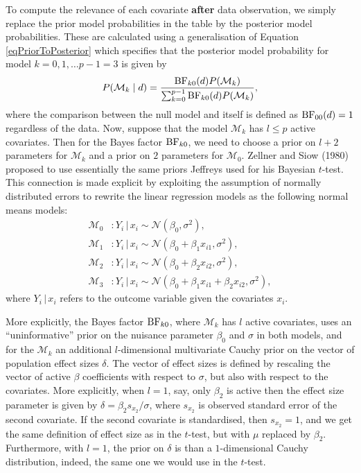 \documentclass[english,,doc,floatsintext]{apa6}
\begin{document}
To compute the relevance of each covariate \textbf{after} data observation, we simply replace the prior model probabilities in the table by the posterior model probabilities. These are calculated using a generalisation of Equation \eqref{eqPriorToPosterior} which specifies that the posterior model probability for model \(k=0, 1, \ldots p-1 = 3\) is given by
\begin{equation}
\label{eqPriorToPosteriorGeneral}
P(\mathcal{M}_{k} \mid d) = \frac{ \textnormal{BF}_{k0}(d) P(\mathcal{M}_{k})}{ \sum_{k=0}^{p-1} \textnormal{BF}_{k0}(d) P(\mathcal{M}_{k})},
\end{equation}
where the comparison between the null model and itself is defined as \(\textnormal{BF}_{00}(d) = 1\) regardless of the data. Now, suppose that the model \(\mathcal{M}_{k}\) has \(l \leq p\) active covariates. Then for the Bayes factor \(\textnormal{BF}_{k0}\), we need to choose a prior on \(l + 2\) parameters for \(\mathcal{M}_{k}\) and a prior on \(2\) parameters for \(\mathcal{M}_{0}\). Zellner and Siow (1980) proposed to use essentially the same priors Jeffreys used for his Bayesian \(t\)-test. This connection is made explicit by exploiting the assumption of normally distributed errors to rewrite the linear regression models as the following normal means models:
\begin{align}
\label{eqLinRegAsNormal0}
\mathcal{M}_{0} & : Y_{i} \, | \, x_{i} \sim \mathcal{N}(\beta_{0}, \sigma^{2}), \\
\mathcal{M}_{1} & : Y_{i} \, | \, x_{i} \sim \mathcal{N}(\beta_{0} + \beta_{1} x_{i1}, \sigma^{2}), \\
\mathcal{M}_{2} & : Y_{i} \, | \, x_{i} \sim \mathcal{N}(\beta_{0} + \beta_{2} x_{i2}, \sigma^{2}), \\
\label{eqLinRegAsNormal3}
\mathcal{M}_{3} & : Y_{i} \, | \, x_{i} \sim \mathcal{N}(\beta_{0} + \beta_{1} x_{i1} + \beta_{2} x_{i2} , \sigma^{2}),
\end{align}
where \(Y_{i} \, | \, x_{i}\) refers to the outcome variable given the covariates \(x_{i}\).

More explicitly, the Bayes factor \(\textnormal{BF}_{k0}\), where \(\mathcal{M}_{k}\) has \(l\) active covariates, uses an \enquote{uninformative} prior on the nuisance parameter \(\beta_{0}\) and \(\sigma\) in both models, and for the \(\mathcal{M}_{k}\) an additional \(l\)-dimensional multivariate Cauchy prior on the vector of population effect sizes \(\delta\). The vector of effect sizes is defined by rescaling the vector of active \(\beta\) coefficients with respect to \(\sigma\), but also with respect to the covariates. More explicitly, when \(l=1\), say, only \(\beta_{2}\) is active then the effect size parameter is given by \(\delta = \beta_{2} s_{x_{2}}/\sigma\), where \(s_{x_{2}}\) is observed standard error of the second covariate. If the second covariate is standardised, then \(s_{x_{2}} = 1\), and we get the same definition of effect size as in the \(t\)-test, but with \(\mu\) replaced by \(\beta_{2}\). Furthermore, with \(l = 1\), the prior on \(\delta\) is than a \(1\)-dimensional Cauchy distribution, indeed, the same one we would use in the \(t\)-test.
\end{document}
